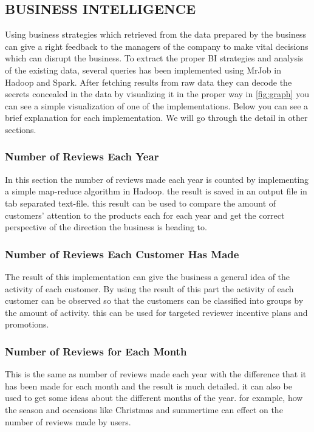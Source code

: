 \subsection{BUSINESS INTELLIGENCE}
Using business strategies which retrieved from the data prepared by the business can give a right feedback to the managers of the company to make vital decisions which can disrupt the business. To extract the proper BI strategies and analysis of the existing data, several queries has been implemented using MrJob in Hadoop and Spark. After fetching results from raw data they can decode the secrets concealed in the data by visualizing it in the proper way in \ref{fig:graph} you can see a simple visualization of one of the implementations. Below you can see a brief explanation for each implementation. We will go through the detail in other sections.

\subsubsection{Number of Reviews Each Year}

In this section the number of reviews made each year is counted by implementing a simple map-reduce algorithm in Hadoop. the result is saved in an output file in tab separated text-file. this result can be used to compare the amount of customers' attention to the products each for each year and get the correct perspective of the direction  the business is heading to.

\subsubsection{Number of Reviews Each Customer Has Made}

The result of this implementation can give the business a general idea of the activity of each customer. By using the result of this part the activity of each customer can be observed so that the customers can be classified into groups by the amount of activity. this can be used for targeted reviewer incentive plans and promotions.

\subsubsection{Number of Reviews for Each Month}

This is the same as number of reviews made each year with the difference that it has been made for each month and the result is much detailed. it can also be used to get some ideas about the different months of the year. for example, how the season and occasions like Christmas and summertime can effect on the number of reviews made by users.

